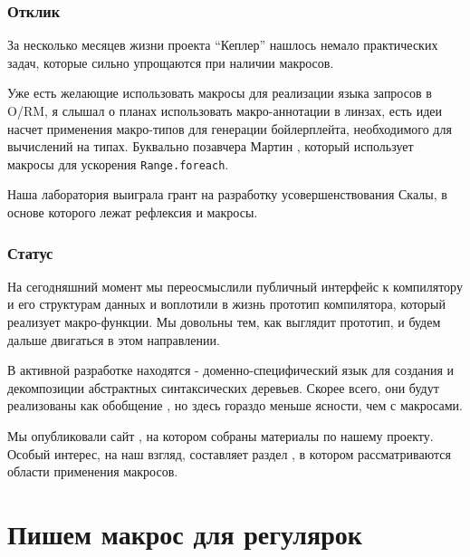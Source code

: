 \documentclass[hyperref={bookmarks=false}]{beamer}
\begin{document}
\begin{frame}[t,fragile]
\frametitle{Отклик}

За несколько месяцев жизни проекта ``Кеплер'' нашлось немало практических задач, которые сильно упрощаются при наличии макросов.

Уже есть желающие использовать макросы для реализации языка запросов в O/RM, я слышал о планах использовать макро-аннотации в линзах, есть идеи насчет применения макро-типов для генерации бойлерплейта, необходимого для вычислений на типах. Буквально позавчера Мартин , который использует макросы для ускорения \texttt{Range.foreach}.

Наша лаборатория выиграла грант  на разработку усовершенствования Скалы, в основе которого лежат рефлексия и макросы.
\end{frame}

\begin{frame}[t,fragile]
\frametitle{Статус}

На сегодняшний момент мы переосмыслили публичный интерфейс к компилятору и его структурам данных и воплотили в жизнь прототип компилятора, который реализует макро-функции. Мы довольны тем, как выглядит прототип, и будем дальше двигаться в этом направлении.

В активной разработке находятся  - доменно-специфический язык для создания и декомпозиции абстрактных синтаксических деревьев. Скорее всего, они будут реализованы как обобщение , но здесь гораздо меньше ясности, чем с макросами.

Мы опубликовали сайт , на котором собраны материалы по нашему проекту. Особый интерес, на наш взгляд, составляет раздел , в котором рассматриваются области применения макросов.
\end{frame}

\section{Пишем макрос для регулярок}
\end{document}
